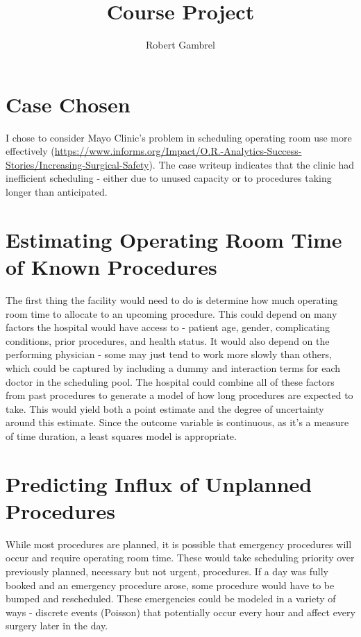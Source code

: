 \documentclass[]{article}
\title{Course Project}
\author{Robert Gambrel}
\begin{document}
\maketitle


\section{Case Chosen}
\begin{large}

I chose to consider Mayo Clinic's problem in scheduling operating room use more effectively (\href{https://www.informs.org/Impact/O.R.-Analytics-Success-Stories/Increasing-Surgical-Safety}{https://www.informs.org/Impact/O.R.-Analytics-Success-Stories/Increasing-Surgical-Safety}). The case writeup indicates that the clinic had inefficient scheduling - either due to unused capacity or to procedures taking longer than anticipated.

\section{Estimating Operating Room Time of Known Procedures}

The first thing the facility would need to do is determine how much operating room time to allocate to an upcoming procedure. This could depend on many factors the hospital would have access to - patient age, gender, complicating conditions, prior procedures, and health status. It would also depend on the performing physician - some may just tend to work more slowly than others, which could be captured by including a dummy and interaction terms for each doctor in the scheduling pool. The hospital could combine all of these factors from past procedures to generate a model of how long procedures are expected to take. This would yield both a point estimate and the degree of uncertainty around this estimate. Since the outcome variable is continuous, as it's a measure of time duration, a least squares model is appropriate.

\section{Predicting Influx of Unplanned Procedures}

While most procedures are planned, it is possible that emergency procedures will occur and require operating room time. These would take scheduling priority over previously planned, necessary but not urgent, procedures. If a day was fully booked and an emergency procedure arose, some procedure would have to be bumped and rescheduled. These emergencies could be modeled in a variety of ways - discrete events (Poisson) that potentially occur every hour and affect every surgery later in the day. 


\end{large}
\end{document}
